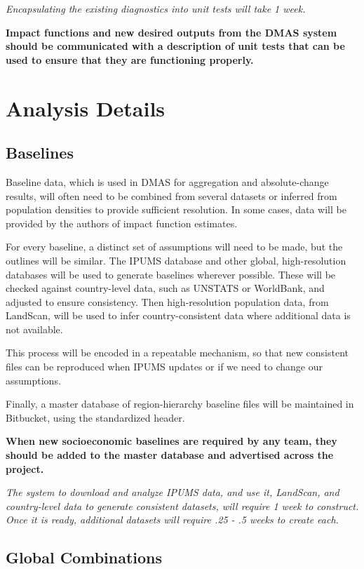 \documentclass[12pt, oneside]{amsart}
\begin{document}
{\it Encapsulating the existing diagnostics into unit tests will take 1 week.}

{\bf Impact functions and new desired outputs from the DMAS system should be communicated with a description of unit tests that can be used to ensure that they are functioning properly.}

\section{Analysis Details}

\subsection{Baselines}
\label{sec:baselines}

Baseline data, which is used in DMAS for aggregation and
absolute-change results, will often need to be combined from several
datasets or inferred from population densities to provide sufficient
resolution.  In some cases, data will be provided by the authors of
impact function estimates.

For every baseline, a distinct set of assumptions will need to be
made, but the outlines will be similar.  The IPUMS database and other
global, high-resolution databases will be used to generate baselines
wherever possible.  These will be checked against country-level data,
such as UNSTATS or WorldBank, and adjusted to ensure consistency.
Then high-resolution population data, from LandScan, will be used to
infer country-consistent data where additional data is not available.

This process will be encoded in a repeatable mechanism, so that new
consistent files can be reproduced when IPUMS updates or if we need to
change our assumptions.

Finally, a master database of region-hierarchy baseline files will be
maintained in Bitbucket, using the standardized header.

{\bf When new socioeconomic baselines are required by any team, they
  should be added to the master database and advertised across the
  project.}

{\it The system to download and analyze IPUMS data, and use it,
  LandScan, and country-level data to generate consistent datasets,
  will require 1 week to construct.  Once it is ready, additional
  datasets will require .25 - .5 weeks to create each.}

\subsection{Global Combinations}
\label{sec:globalcombo}
\end{document}
